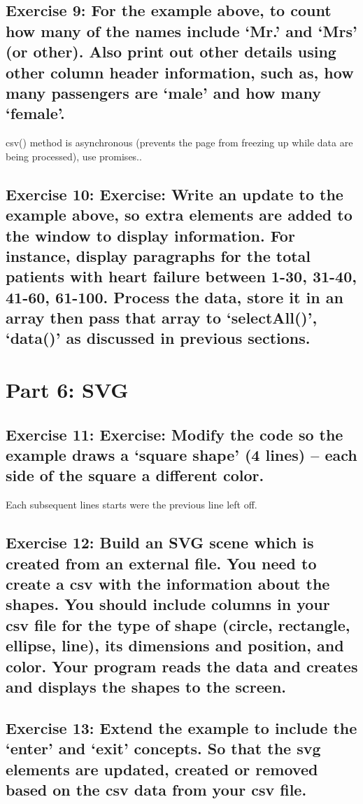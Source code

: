 \documentclass[11pt]{article}   	%
\begin{document}
\subsection{Exercise 9: For the example above, to count how many of the names include ‘Mr.’ and ‘Mrs’ (or other). Also print out other details using other column header information, such as, how many passengers are ‘male’ and how many ‘female’.}
csv() method is asynchronous (prevents the page from freezing up while data are being processed), use promises..

\subsection{Exercise 10: Exercise: Write an update to the example above, so extra elements are added to the window to display information. For instance, display paragraphs for the total patients with heart failure between 1-30, 31-40, 41-60, 61-100. Process the data, store it in an array then pass that array to ‘selectAll()’, ‘data()’ as discussed in previous sections.}


\section{Part 6: SVG}
\subsection{Exercise 11: Exercise: Modify the code so the example draws a ‘square shape’ (4 lines) – each side of the square a different color.}
Each subsequent lines starts were the previous line left off.

\subsection{Exercise 12: Build an SVG scene which is created from an external file. You need to create a csv with the information about the shapes. You should include columns in your csv file for the type of shape (circle, rectangle, ellipse, line), its dimensions and position, and color. Your program reads the data and creates and displays the shapes to the screen.}
\subsection{ Exercise 13: Extend the example to include the ‘enter’ and ‘exit’ concepts. So that the svg elements are updated, created or removed based on the csv data from your csv file.}
\end{document}
